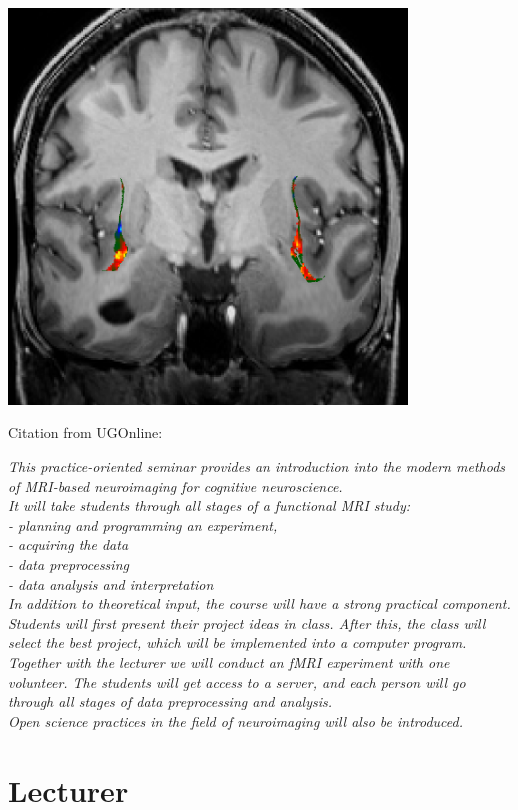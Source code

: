 \documentclass[
  letterpaper,
]{report}
\begin{document}
\includegraphics[width=4.16667in,height=\textheight,keepaspectratio]{images/claus_7TCOR_activity_website.png}

Citation from UGOnline:

\emph{This practice-oriented seminar provides an introduction into the
modern methods of MRI-based neuroimaging for cognitive neuroscience.\\
It will take students through all stages of a functional MRI study:\\
- planning and programming an experiment,\\
- acquiring the data\\
- data preprocessing\\
- data analysis and interpretation\\
In addition to theoretical input, the course will have a strong
practical component. Students will first present their project ideas in
class. After this, the class will select the best project, which will be
implemented into a computer program. Together with the lecturer we will
conduct an fMRI experiment with one volunteer. The students will get
access to a server, and each person will go through all stages of data
preprocessing and analysis.\\
Open science practices in the field of neuroimaging will also be
introduced.}

\section*{Lecturer}\label{lecturer}
\end{document}
